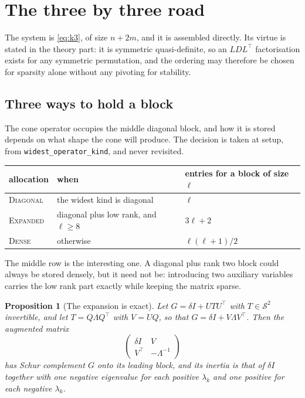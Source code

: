 \documentclass[a4paper,11pt]{book}
\theoremstyle{plain}
\newtheorem{proposition}[theorem]{Proposition}
\theoremstyle{definition}
\theoremstyle{remark}
\numberwithin{equation}{chapter}
\numberwithin{algorithm}{chapter}
\newcommand{\Sp}{\mathcal{S}}
\begin{document}
	\section{The three by three road}

	The system is \eqref{eq:k3}, of size $n+2m$, and it is assembled directly.
	Its virtue is stated in the theory part: it is symmetric quasi-definite, so
	an $LDL^{\top}$ factorisation exists for any symmetric permutation, and the
	ordering may therefore be chosen for sparsity alone without any pivoting for
	stability.

	\subsection{Three ways to hold a block}

	The cone operator occupies the middle diagonal block, and how it is stored
	depends on what shape the cone will produce. The decision is taken at setup,
	from \texttt{widest\_operator\_kind}, and never revisited.

	\begin{table}[H]
		\centering\small
		\begin{tabular}{lll}
			\toprule
			allocation & when & entries for a block of size $\ell$\\
			\midrule
			\textsc{Diagonal} & the widest kind is diagonal & $\ell$\\
			\textsc{Expanded} & diagonal plus low rank, and
			$\ell\geq8$ & $3\ell+2$\\
			\textsc{Dense} & otherwise & $\ell(\ell+1)/2$\\
			\bottomrule
		\end{tabular}
	\end{table}

	The middle row is the interesting one. A diagonal plus rank two block could
	always be stored densely, but it need not be: introducing two auxiliary
	variables carries the low rank part exactly while keeping the matrix sparse.

	\begin{proposition}[The expansion is exact]\label{prop:expansion}
		Let $G=\delta I+UTU^{\top}$ with $T\in\Sp^2$ invertible, and let
		$T=Q\Lambda Q^{\top}$ with $V=UQ$, so that
		$G=\delta I+V\Lambda V^{\top}$. Then the augmented matrix
		\begin{equation}
			\begin{pmatrix}
				\delta I & V\\
				V^{\top} & -\Lambda^{-1}
			\end{pmatrix}
		\end{equation}
		has Schur complement $G$ onto its leading block, and its inertia is that of
		$\delta I$ together with one negative eigenvalue for each positive
		$\lambda_k$ and one positive for each negative $\lambda_k$.
	\end{proposition}
\end{document}
